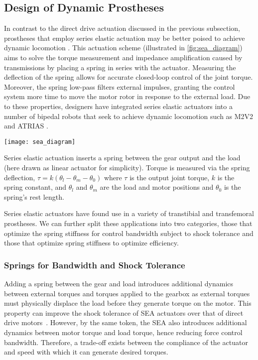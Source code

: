 

\subsection{Design of Dynamic Prostheses}
In contrast to the direct drive actuation discussed in the previous subsection,
prostheses that employ series elastic actuation may be better poised to achieve
dynamic locomotion \citep{pratt1995series}. This actuation scheme (illustrated
in \cref{fig:sea_diagram}) aims to solve the torque measurement and impedance
amplification caused by transmissions by placing a spring in series with the
actuator. Measuring the deflection of the spring allows for accurate closed-loop
control of the joint torque. Moreover, the spring low-pass filters external
impulses, granting the control system more time to move the motor rotor in
response to the external load.  Due to these properties, designers have
integrated series elastic actuators into a number of bipedal robots that seek to
achieve dynamic locomotion such as M2V2 \citep{pratt2008design} and ATRIAS
\citep{grimes2013atrias}.

\begin{marginfigure}
    \centering
    \texttt{[image: sea\_diagram]}
    \caption{Series elastic actuation inserts a spring between the gear output
    and the load (here drawn as linear actuator for simplicity). Torque is
    measured via the spring deflection, $\tau = k(\theta_l - \theta_m -
    \theta_0)$ where $\tau$ is the output joint torque, $k$ is the spring
    constant, and $\theta_l$ and $\theta_m$ are the load and motor positions and
    $\theta_0$ is the spring's rest length.}
    \label{fig:sea_diagram}
\end{marginfigure}

Series elastic actuators have found use in a variety of transtibial and
transfemoral prostheses. We can further split these applications into two
categories, those that optimize the spring stiffness for control bandwidth
subject to shock tolerance and those that optimize spring stiffness to optimize
efficiency.

\subsubsection{Springs for Bandwidth and Shock Tolerance}
Adding a spring between the gear and load introduces additional dynamics between
external torques and torques applied to the gearbox as external torques must
physically displace the load before they generate torque on the motor. This
property can improve the shock tolerance of SEA actuators over that of direct
drive motors~\citep{robinson2000design}. However, by the same token, the SEA
also introduces additional dynamics between motor torque and load torque, hence
reducing force control bandwidth. Therefore, a trade-off exists between the
compliance of the actuator and speed with which it can generate desired torques.


